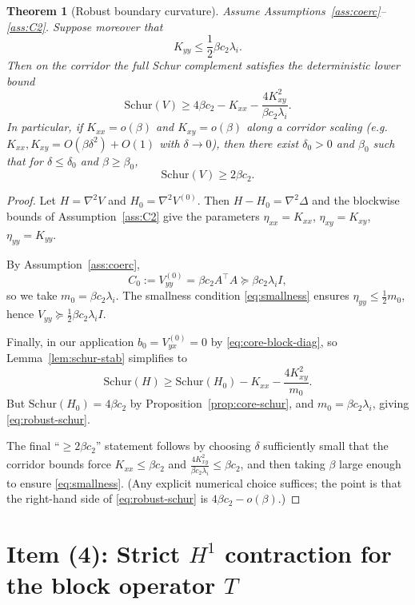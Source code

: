 \documentclass[11pt]{article}
\newtheorem{theorem}{Theorem}[section]
\theoremstyle{definition}
\newcommand{\1}{\mathbf{1}}
\begin{document}
\begin{theorem}[Robust boundary curvature]\label{thm:robust-schur}
Assume Assumptions~\ref{ass:coerc}--\ref{ass:C2}. Suppose moreover that
\begin{equation}\label{eq:smallness}
K_{yy}\le \frac12 \beta c_2\lambda_i.
\end{equation}
Then on the corridor the full Schur complement satisfies the deterministic lower bound
\begin{equation}\label{eq:robust-schur}
\mathrm{Schur}(V)
\ge
4\beta c_2
- K_{xx}
- \frac{4 K_{xy}^2}{\beta c_2\lambda_i}.
\end{equation}
In particular, if $K_{xx}=o(\beta)$ and $K_{xy}=o(\beta)$ along a corridor scaling (e.g. $K_{xx},K_{xy}=O(\beta\delta^2)+O(1)$ with $\delta\to0$), then there exist $\delta_0>0$ and $\beta_0$ such that for $\delta\le \delta_0$ and $\beta\ge \beta_0$,
\[
\mathrm{Schur}(V)\ge 2\beta c_2.
\]
\end{theorem}

\begin{proof}
Let $H=\nabla^2 V$ and $H_0=\nabla^2 V^{(0)}$. Then $H-H_0=\nabla^2\Delta$ and the blockwise bounds of Assumption~\ref{ass:C2} give the parameters $\eta_{xx}=K_{xx}$, $\eta_{xy}=K_{xy}$, $\eta_{yy}=K_{yy}$.

By Assumption~\ref{ass:coerc},
\[
C_0:=V^{(0)}_{yy}=\beta c_2 A^\top A\succeq \beta c_2\lambda_i I,
\]
so we take $m_0=\beta c_2\lambda_i$. The smallness condition \eqref{eq:smallness} ensures $\eta_{yy}\le \tfrac12 m_0$, hence $V_{yy}\succeq \tfrac12 \beta c_2\lambda_i I$.

Finally, in our application $b_0=V^{(0)}_{yx}=0$ by \eqref{eq:core-block-diag}, so Lemma~\ref{lem:schur-stab} simplifies to
\[
\mathrm{Schur}(H)\ge \mathrm{Schur}(H_0)-K_{xx}-\frac{4K_{xy}^2}{m_0}.
\]
But $\mathrm{Schur}(H_0)=4\beta c_2$ by Proposition~\ref{prop:core-schur}, and $m_0=\beta c_2\lambda_i$, giving \eqref{eq:robust-schur}.

The final ``$\ge 2\beta c_2$'' statement follows by choosing $\delta$ sufficiently small that the corridor bounds force $K_{xx}\le \beta c_2$ and $\frac{4K_{xy}^2}{\beta c_2\lambda_i}\le \beta c_2$, and then taking $\beta$ large enough to ensure \eqref{eq:smallness}. (Any explicit numerical choice suffices; the point is that the right-hand side of \eqref{eq:robust-schur} is $4\beta c_2-o(\beta)$.)
\end{proof}

\section{Item (4): Strict $H^1$ contraction for the block operator $T$}
\end{document}
